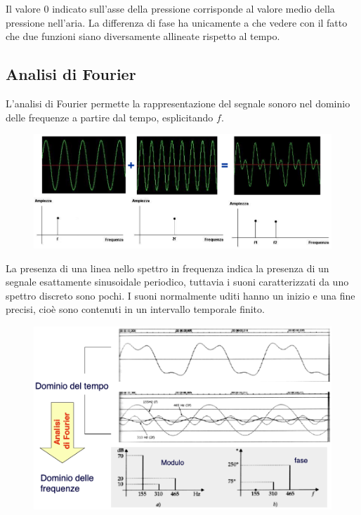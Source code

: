 Il valore 0 indicato sull'asse della pressione corrisponde al valore medio della pressione nell'aria. La differenza di fase ha unicamente a che vedere con il fatto che due funzioni siano diversamente allineate rispetto al tempo.

\subsection{Analisi di Fourier}
L'analisi di Fourier permette la rappresentazione del segnale sonoro nel dominio delle frequenze a partire dal tempo, esplicitando $f$.

\begin{figure}[h]
	\centering
	\includegraphics[scale=0.45]{Lezioni/Immagini/ondeverdi}
\end{figure}

La presenza di una linea nello spettro in frequenza indica la presenza di un segnale esattamente sinusoidale periodico, tuttavia i suoni caratterizzati da uno spettro discreto sono pochi. I suoni normalmente uditi hanno un inizio e una fine precisi, cioè sono contenuti in un intervallo temporale finito.

\begin{figure}[h]
	\centering
	\includegraphics[scale=0.4]{Lezioni/Immagini/ondestorte}
\end{figure}

